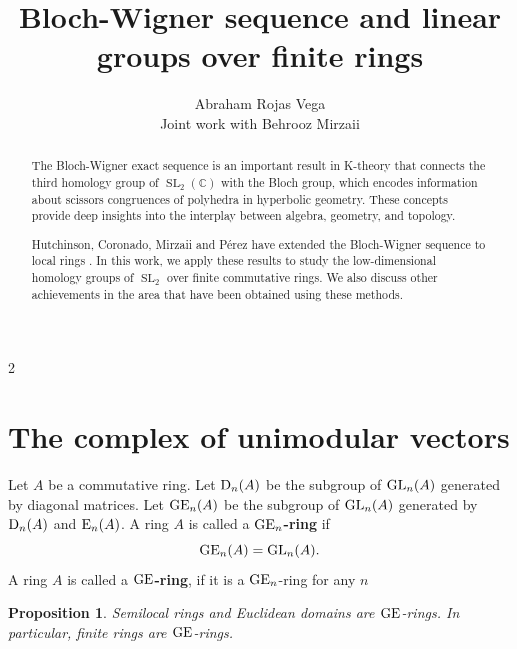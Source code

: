 \documentclass[a0]{sciposter}
\title{Bloch-Wigner sequence and linear groups over finite rings}
\author{ \LARGE Abraham Rojas Vega \\ \large Joint work with Behrooz Mirzaii }
\institute 
{ICMC-USP}
\newtheorem{prp}{Proposition}
\theoremstyle{definition}
\newcommand{\D}{{\rm D}}
\newcommand{\Ee}{{\rm E}}
\newcommand{\GE}{{\rm GE}}
\newcommand{\GL}{{\rm GL}}
\begin{document}

\maketitle

\newcommand{\mycaption}{%
\ifx \@captype \@undefined \@latex@error {\noexpand \caption outside float}\@ehd \expandafter \@gobble \else \refstepcounter \@captype \expandafter \@firstofone \fi {\@dblarg {\@caption \@captype }}%
}%

\begin{multicols}{2}


\begin{abstract}
The Bloch-Wigner exact sequence is an important result in K-theory that connects the third homology group of $\operatorname{SL}_2(\mathbb{C})$ with the Bloch group, which encodes information about scissors congruences of polyhedra in hyperbolic geometry. These concepts provide deep insights into the interplay between algebra, geometry, and topology. 

Hutchinson, Coronado, Mirzaii and Pérez have extended the Bloch-Wigner sequence to local rings \cite{hut2013,tesiselvis}.
In this work, we apply these results to study the low-dimensional homology groups of $\operatorname{SL}_2$ over finite commutative rings. We also discuss other achievements in the area that have been obtained using these methods.
\end{abstract}


\section{The complex of unimodular vectors}

Let $A$ be a commutative ring.
Let $\D_n(A)$ be the subgroup of $\GL_n(A)$ generated by diagonal matrices. Let $\GE_n(A)$ 
be the subgroup of $\GL_n(A)$  generated by $\D_n(A)$ and $\Ee_n(A)$. 
A ring $A$ is called a \textbf{$\GE_n$-ring} if 
\[
\GE_n(A)=\GL_n(A).
\]
A ring $A$ is called a \textbf{$\GE$-ring}, if it is a $\GE_n$-ring for any $n$ 

\begin{prp} Semilocal rings and Euclidean domains are $\GE$-rings. In particular,
finite rings are $\GE$-rings.
\end{prp}


\end{multicols}
\end{document}
